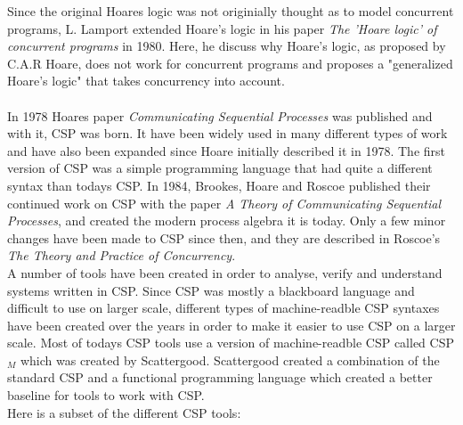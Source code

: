 \documentclass[a4paper]{report}
\newcommand{\cspm}{CSP$_M$ }
\begin{document}
Since the original Hoares logic was not originially thought as to model concurrent programs, L. Lamport extended Hoare's logic in his paper \textit{The 'Hoare logic' of concurrent programs}\cite{Lamport1980} in 1980. Here, he discuss why Hoare's logic, as proposed by C.A.R Hoare, does not work for concurrent programs and proposes a "generalized Hoare's logic" that takes concurrency into account. \\\\
In 1978 Hoares paper \textit{Communicating Sequential Processes} was published and with it, CSP was born. It have been widely used in many different types of work and have also been expanded since Hoare initially described it in 1978\cite{Abdallah2005}. The first version of CSP was a simple programming language that had quite a different syntax than todays CSP. In 1984, Brookes, Hoare and Roscoe published their continued work on CSP with the paper \textit{A Theory of Communicating Sequential Processes}\cite{Brookes1984}, and created the modern process algebra it is today. Only a few minor changes have been made to CSP since then, and they are described in Roscoe's \textit{The Theory and Practice of Concurrency}\cite{Roscoe1997}.\\
A number of tools have been created in order to analyse, verify and understand systems written in CSP. Since CSP was mostly a blackboard language and difficult to use on larger scale, different types of machine-readble CSP syntaxes have been created over the years in order to make it easier to use CSP on a larger scale. Most of todays CSP tools use a version of machine-readble CSP called \cspm which was created by Scattergood\cite{Scattergood1998}. Scattergood created a combination of the standard CSP and a functional programming language which created a better baseline for tools to work with CSP.\\ 
Here is a subset of the different CSP tools:
\end{document}
